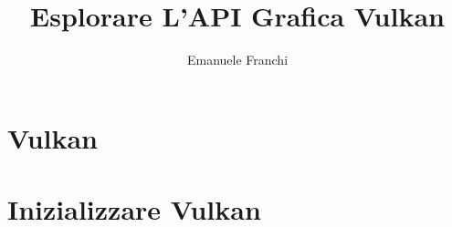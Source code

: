 \documentclass{beamer}
\title{Esplorare L'API Grafica Vulkan}
\author{Emanuele Franchi}
\date{}
\begin{document}


\section{Vulkan}





\section{Inizializzare Vulkan}




\end{document}
